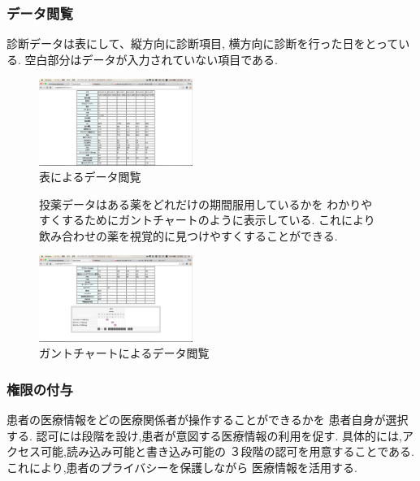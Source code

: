   \subsubsection{データ閲覧}
    診断データは表にして、縦方向に診断項目,
    横方向に診断を行った日をとっている.
    空白部分はデータが入力されていない項目である.

    \begin{figure}[htbp]
        \includegraphics[width=5cm, bb=0 0 645 790]{./gazou/DjangoTable.png} %
      \caption{表によるデータ閲覧}
      \label{DjangoTable}
    \end{figure}

    \begin{figure}[htbp]

    投薬データはある薬をどれだけの期間服用しているかを
    わかりやすくするためにガントチャートのように表示している.
    これにより飲み合わせの薬を視覚的に見つけやすくすることができる.

      \includegraphics[width=5cm, bb=0 0 645 790]{./gazou/DjangoGantt.png} %
    \caption{ガントチャートによるデータ閲覧}
    \label{DjangoGantt}
  \end{figure}

  \subsubsection{権限の付与}
    患者の医療情報をどの医療関係者が操作することができるかを
    患者自身が選択する.
    認可には段階を設け,患者が意図する医療情報の利用を促す.
    具体的には,アクセス可能,読み込み可能と書き込み可能の
    ３段階の認可を用意することである.
    これにより,患者のプライバシーを保護しながら
    医療情報を活用する.


